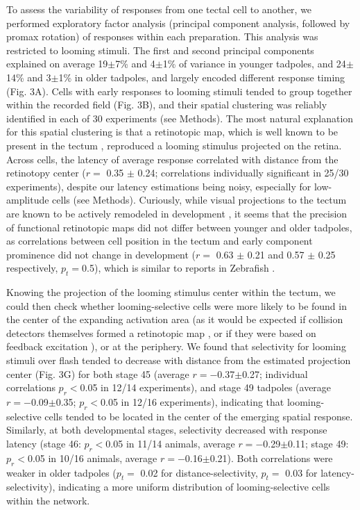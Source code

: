\documentclass{article}
\begin{document}
To assess the variability of responses from one tectal cell to another, we performed exploratory factor analysis (principal component analysis, followed by promax rotation) of responses within each preparation. This analysis was restricted to looming stimuli. The first and second principal components explained on average 19$\pm$7\% and 4$\pm$1\% of variance in younger tadpoles, and 24$\pm$14\% and 3$\pm$1\% in older tadpoles, and largely encoded different response timing (Fig. 3A). Cells with early responses to looming stimuli tended to group together within the recorded field (Fig. 3B), and their spatial clustering was reliably identified in each of 30 experiments (see Methods). The most natural explanation for this spatial clustering is that a retinotopic map, which is well known to be present in the tectum \citep{ruthazer2004map}, reproduced a looming stimulus projected on the retina. Across cells, the latency of average response correlated with distance from the retinotopy center ($r=$ 0.35 $\pm$ 0.24; correlations individually significant in 25/30 experiments), despite our latency estimations being noisy, especially for low-amplitude cells (see Methods). Curiously, while visual projections to the tectum are known to be actively remodeled in development \citep{sakaguchi1985refinement,ruthazer2004map,munz2014hebbian}, it seems that the precision of functional retinotopic maps did not differ between younger and older tadpoles, as correlations between cell position in the tectum and early component prominence did not change in development ($r=$ 0.63 $\pm$ 0.21 and 0.57 $\pm$ 0.25 respectively, $p_t= $0.5), which is similar to reports in Zebrafish \citep{avitan2016limitations}.


Knowing the projection of the looming stimulus center within the tectum, we could then check whether looming-selective cells were more likely to be found in the center of the expanding activation area (as it would be expected if collision detectors themselves formed a retinotopic map \citep{frost2004review}, or if they were based on feedback excitation \citep{jang2016}), or at the periphery. We found that selectivity for looming stimuli over flash tended to decrease with distance from the estimated projection center (Fig. 3G) for both stage 45 (average $r=-$0.37$\pm$0.27; individual correlations $p_r<$0.05 in 12/14 experiments), and stage 49 tadpoles (average $r=-$0.09$\pm$0.35; $p_r<$0.05 in 12/16 experiments), indicating that looming-selective cells tended to be located in the center of the emerging spatial response. Similarly, at both developmental stages, selectivity decreased with response latency (stage 46: $p_r<$0.05 in 11/14 animals, average $r=-$0.29$\pm$0.11; stage 49: $p_r<$0.05 in 10/16 animals, average $r=-$0.16$\pm$0.21). Both correlations were weaker in older tadpoles ($p_t=$ 0.02 for distance-selectivity, $p_t=$ 0.03 for latency-selectivity), indicating a more uniform distribution of looming-selective cells within the network.
\end{document}

